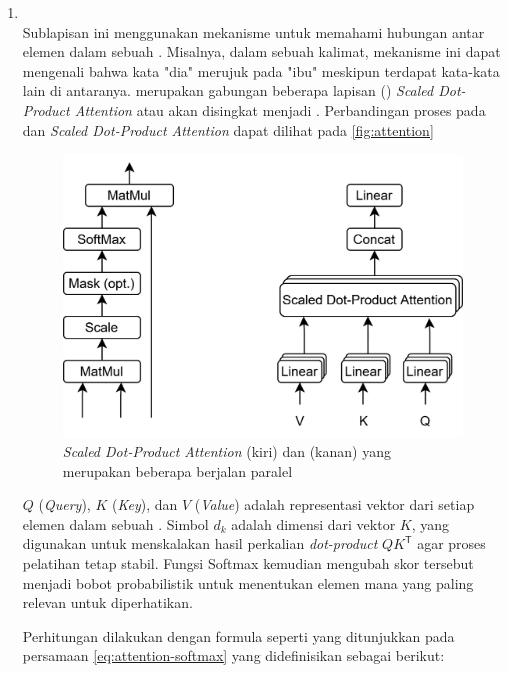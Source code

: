 \begin{enumerate}
	\item \mha~\\
	      Sublapisan ini menggunakan mekanisme \selfattention{} untuk memahami hubungan antar elemen dalam sebuah \sequence{}. Misalnya, dalam sebuah kalimat, mekanisme ini dapat mengenali bahwa kata "dia"
	      merujuk pada "ibu" meskipun terdapat kata-kata lain di antaranya.
	      \mha{} merupakan gabungan beberapa lapisan (\layer)
	      \emph{Scaled Dot-Product Attention} atau akan disingkat menjadi \attention. Perbandingan proses pada \mha{} dan \emph{Scaled Dot-Product Attention} dapat dilihat pada \autoref{fig:attention}

	      \begin{figure}[htbp]
		      \centering
		      \includegraphics[width=.8\textwidth]{images/attentionmha.png}
		      \caption{\emph{Scaled Dot-Product Attention} (kiri) dan \mha{} (kanan) yang merupakan beberapa \layer{} \attention{} berjalan paralel \parencite{vaswani2017attention}}
		      \label{fig:attention}
	      \end{figure}

	      $Q$ (\emph{Query}), $K$ (\emph{Key}), dan $V$ (\emph{Value}) adalah representasi vektor dari setiap elemen dalam sebuah \sequence. Simbol $d_k$ adalah dimensi dari vektor $K$, yang digunakan untuk menskalakan hasil perkalian \emph{dot-product} $QK^\mathsf{T}$ agar proses pelatihan tetap stabil. Fungsi Softmax kemudian mengubah skor tersebut menjadi bobot probabilistik untuk menentukan elemen mana yang paling relevan untuk diperhatikan.

	      \pagebreak

	      Perhitungan \attention{} dilakukan dengan formula seperti yang ditunjukkan pada persamaan \eqref{eq:attention-softmax} \parencite{vaswani2017attention} yang didefinisikan sebagai berikut:


\end{enumerate}
